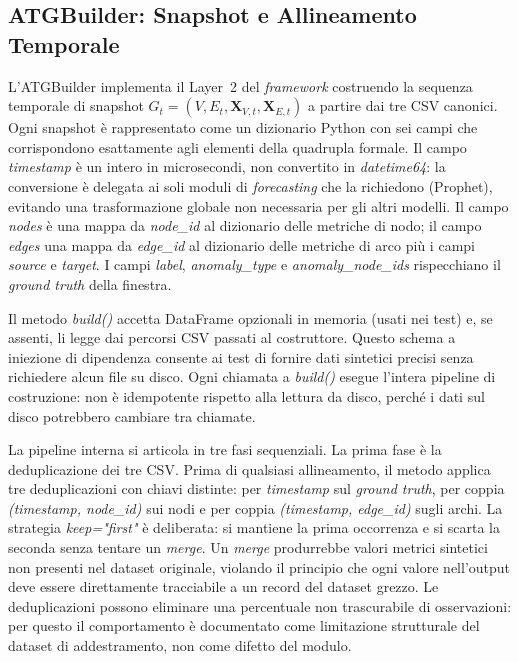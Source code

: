 \subsection{ATGBuilder: Snapshot e Allineamento Temporale}
\label{subsec:impl_atg}

L'ATGBuilder implementa il Layer~2 del \textit{framework} costruendo la sequenza temporale di
snapshot $G_t = (V, E_t, \mathbf{X}_{V,t}, \mathbf{X}_{E,t})$ a partire dai tre CSV canonici.
Ogni snapshot è rappresentato come un dizionario Python con sei campi che corrispondono
esattamente agli elementi della quadrupla formale. Il campo \textit{timestamp} è un intero in
microsecondi, non convertito in \textit{datetime64}: la conversione è delegata ai soli moduli
di \textit{forecasting} che la richiedono (Prophet), evitando una trasformazione globale non
necessaria per gli altri modelli. Il campo \textit{nodes} è una mappa da \textit{node\_id} al
dizionario delle metriche di nodo; il campo \textit{edges} una mappa da \textit{edge\_id} al
dizionario delle metriche di arco più i campi \textit{source} e \textit{target}. I campi
\textit{label}, \textit{anomaly\_type} e \textit{anomaly\_node\_ids} rispecchiano il
\textit{ground truth} della finestra.

Il metodo \textit{build()} accetta DataFrame opzionali in memoria (usati nei test) e, se assenti,
li legge dai percorsi CSV passati al costruttore. Questo schema a iniezione di dipendenza consente
ai test di fornire dati sintetici precisi senza richiedere alcun file su disco. Ogni chiamata a
\textit{build()} esegue l'intera pipeline di costruzione: non è idempotente rispetto alla lettura
da disco, perché i dati sul disco potrebbero cambiare tra chiamate.

La pipeline interna si articola in tre fasi sequenziali. La prima fase è la deduplicazione dei
tre CSV. Prima di qualsiasi allineamento, il metodo applica tre deduplicazioni con chiavi distinte:
per \textit{timestamp} sul \textit{ground truth}, per coppia \textit{(timestamp, node\_id)} sui
nodi e per coppia \textit{(timestamp, edge\_id)} sugli archi. La strategia \textit{keep="first"}
è deliberata: si mantiene la prima occorrenza e si scarta la seconda senza tentare un \textit{merge}.
Un \textit{merge} produrrebbe valori metrici sintetici non presenti nel dataset originale,
violando il principio che ogni valore nell'output deve essere direttamente tracciabile a un record
del dataset grezzo. Le deduplicazioni possono eliminare una percentuale non trascurabile di
osservazioni: per questo il comportamento è documentato come limitazione strutturale del dataset
di addestramento, non come difetto del modulo.

